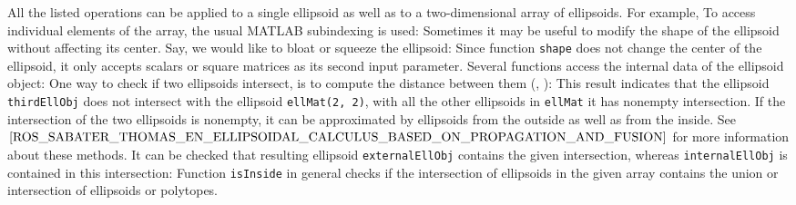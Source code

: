 All the listed operations can be applied to a single ellipsoid as well as to
a two-dimensional array of ellipsoids.
For example,
To access individual elements of the array, the usual MATLAB subindexing
is used:
Sometimes it may be useful to modify the shape of the ellipsoid without
affecting its center. Say, we would like to bloat or squeeze the ellipsoid:
Since function {\tt shape} does not change the center of the ellipsoid,
it only accepts scalars or square matrices as its second input parameter.
Several functions  access the internal data of
the ellipsoid object:
One way to check if two ellipsoids intersect, is to compute
the distance between them (\cite{CHAN_DISTANCE_ARTICLE}, \cite{LIN_HAN_ON_DISTANCE_BETWEEN_ELLIPSOIDS}):
This result indicates that the ellipsoid {\tt thirdEllObj} does not intersect with
the ellipsoid {\tt ellMat(2, 2)}, with all the other ellipsoids in {\tt ellMat}
it has nonempty intersection. If the intersection of the two ellipsoids is
nonempty, it can be approximated by ellipsoids from the outside as well as
from the inside. See $\cite{ROS_SABATER_THOMAS_EN_ELLIPSOIDAL_CALCULUS_BASED_ON_PROPAGATION_AND_FUSION}$ for more information about these methods.
It can be checked that resulting ellipsoid {\tt externalEllObj} contains the given
intersection, whereas {\tt internalEllObj} is contained in this intersection:
Function {\tt isInside} in general checks if the intersection of ellipsoids
in the given array contains the union or intersection of ellipsoids or
polytopes.

